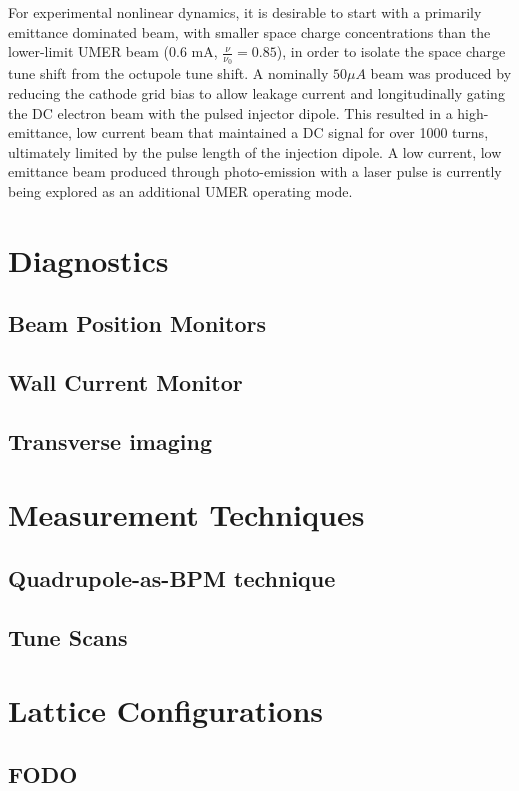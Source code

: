 	
For experimental nonlinear dynamics, it is desirable to start with a primarily emittance dominated beam, with smaller space charge concentrations than the lower-limit UMER beam (0.6 mA, $\frac{\nu}{\nu_0}=0.85$), in order to isolate the space charge tune shift from the octupole tune shift. 
A nominally $50 \mu A$ beam was produced by reducing the cathode grid bias to allow leakage current and longitudinally gating the DC electron beam with the pulsed injector dipole. 
This resulted in a high-emittance, low current beam that maintained a DC signal for over 1000 turns, ultimately limited by the pulse length of the injection dipole. 
A low current, low emittance beam produced through photo-emission with a laser pulse is currently being explored as an additional UMER operating mode. 
	
	
\section{Diagnostics}
\subsection{Beam Position Monitors}
\subsection{Wall Current Monitor}
\subsection{Transverse imaging}

\section{Measurement Techniques}
\subsection{Quadrupole-as-BPM technique}
\subsection{Tune Scans}	
	
	
\section{Lattice Configurations}
\subsection{FODO}

